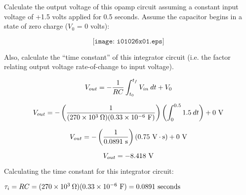 

Calculate the output voltage of this opamp circuit assuming a constant input voltage of +1.5 volts applied for 0.5 seconds.  Assume the capacitor begins in a state of zero charge ($V_0$ = 0 volts):

$$\texttt{[image: i01026x01.eps]}$$

Also, calculate the ``time constant'' of this integrator circuit (i.e. the factor relating output voltage rate-of-change to input voltage).







$$V_{out} = -{1 \over RC} \int_{t_0}^{t_f} V_{in} \> dt + V_0$$

$$V_{out} = -\left({1 \over (270 \times 10^3 \> \Omega)(0.33 \times 10^{-6} \hbox{ F})}\right) \left( \int_{0}^{0.5} 1.5 \> dt \right) + 0 \hbox{ V}$$

$$V_{out} = - \left( {1 \over 0.0891 \hbox{ s}} \right) (0.75 \hbox{ V} \cdot \hbox{s}) + 0 \hbox{ V}$$

$$V_{out} = - 8.418 \hbox{ V}$$

\vskip 10pt

Calculating the time constant for this integrator circuit:

\vskip 10pt

$\tau_i = RC = (270 \times 10^3 \> \Omega)(0.33 \times 10^{-6} \hbox{ F}) = 0.0891 \hbox{ seconds}$











